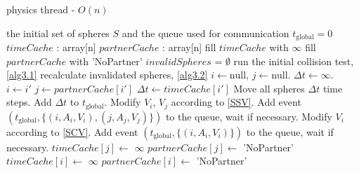 \documentclass[journal, letterpaper]{IEEEtran}
\begin{document}
\begin{algorithm}
\caption{physics thread - $O(n)$}
\label{alg3}
\begin{algorithmic}
	\REQUIRE the initial set of spheres $S$ and the queue used for communication
	\STATE $t_\text{global}=0$ 
	\STATE $timeCache$ : array[n]
	\STATE $partnerCache$ : array[n]
	\STATE fill $timeCache$ with $\infty$
	\STATE fill $partnerCache$ with 'NoPartner'
	\STATE $invalidSpheres$ = $\emptyset$ 
	\STATE run the initial collision test, \ref{alg3.1}
		\STATE recalculate invalidated spheres, \ref{alg3.2}
		\STATE $i \leftarrow \text{null}$, $j \leftarrow \text{null}$.
		\STATE $\Delta t \leftarrow  \infty$.
				\STATE $i \leftarrow i'$
				\STATE $j \leftarrow partnerCache[i']$
				\STATE $\Delta t \leftarrow timeCache[i']$
			\ENDIF
		\ENDFOR
		\STATE Move all spheres $\Delta t$ time steps.
		\STATE Add $\Delta t$ to $t_\text{global}$.
			\STATE Modify $V_i$, $V_j$ according to \ref{SSV}.
			\STATE Add event $(t_\text{global}, \{(i, A_i, V_i), (j, A_j, V_j)\})$ to the queue, wait if necessary.
			\STATE Modify $V_i$ according to \ref{SCV}.
			\STATE Add event $(t_\text{global}, \{(i, A_i, V_i)\})$ to the queue, wait if necessary.
			\STATE $timeCache[j] \leftarrow$ $\infty$
			\STATE $partnerCache[j] \leftarrow$ 'NoPartner'
		\ENDIF
		\STATE $timeCache[i] \leftarrow$ $\infty$
		\STATE $partnerCache[i] \leftarrow$ 'NoPartner'
	\ENDLOOP
\end{algorithmic}
\end{algorithm}
\end{document}
